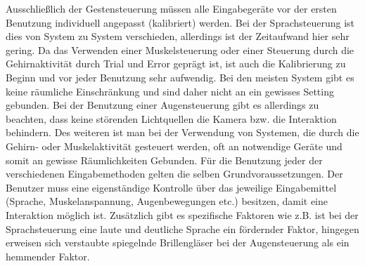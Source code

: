 \newline \newline
Ausschließlich der Gestensteuerung müssen alle Eingabegeräte vor der ersten Benutzung individuell angepasst (kalibriert) werden. Bei der Sprachsteuerung ist dies von System zu System verschieden, allerdings ist der Zeitaufwand hier sehr gering. Da das Verwenden einer Muskelsteuerung oder einer Steuerung durch die Gehirnaktivität durch Trial und Error geprägt ist, ist auch die Kalibrierung zu Beginn und vor jeder Benutzung sehr aufwendig.
\newline \newline
Bei den meisten System gibt es keine räumliche Einschränkung und sind daher nicht an ein gewisses Setting gebunden. Bei der Benutzung einer Augensteuerung gibt es allerdings zu beachten, dass keine störenden Lichtquellen die Kamera bzw. die Interaktion behindern. Des weiteren ist man bei der Verwendung von Systemen, die durch die Gehirn- oder Muskelaktivität gesteuert werden, oft an notwendige Geräte und somit an gewisse Räumlichkeiten Gebunden.
\newline \newline
Für die Benutzung jeder der verschiedenen Eingabemethoden gelten die selben Grundvoraussetzungen. Der Benutzer muss eine eigenständige Kontrolle über das jeweilige Eingabemittel (Sprache, Muskelanspannung, Augenbewegungen etc.) besitzen, damit eine Interaktion möglich ist. Zusätzlich gibt es spezifische Faktoren wie z.B. ist bei der Sprachsteuerung eine laute und deutliche Sprache ein fördernder Faktor, hingegen erweisen sich verstaubte spiegelnde Brillengläser bei der Augensteuerung als ein hemmender Faktor.
%
%
%
%
%
%
